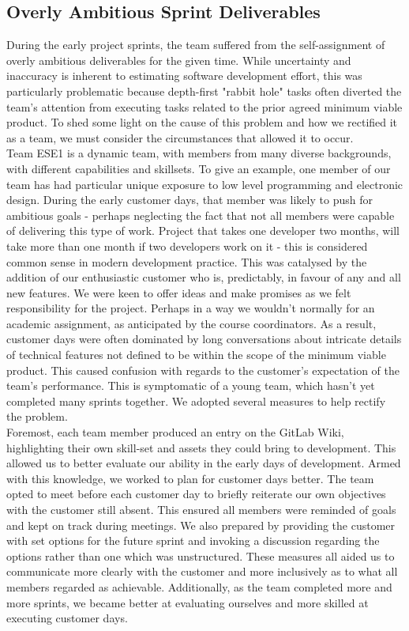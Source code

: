 \documentclass{l3proj}
\begin{document}
\subsection{Overly Ambitious Sprint Deliverables}
During the early project sprints, the team suffered from the self-assignment of overly ambitious deliverables for the given time. While uncertainty and inaccuracy is inherent to estimating software development effort\cite{ezghari}, this was particularly problematic because depth-first "rabbit hole" tasks often diverted the team's attention from executing tasks related to the prior agreed minimum viable product. To shed some light on the cause of this problem and how we rectified it as a team, we must consider the circumstances that allowed it to occur.
\\
Team ESE1 is a dynamic team, with members from many diverse backgrounds, with different capabilities and skillsets. To give an example, one member of our team has had particular unique exposure to low level programming and electronic design. During the early customer days, that member was likely to push for ambitious goals - perhaps neglecting the fact that not all members were capable of delivering this type of work. Project that takes one developer two months, will take more than one month if two developers work on it\cite{brooks} - this is considered common sense in modern development practice\cite{hanakawa}. This was catalysed by the addition of our enthusiastic customer who is, predictably, in favour of any and all new features. We were keen to offer ideas and make promises as we felt responsibility for the project. Perhaps in a way we wouldn't normally for an academic assignment, as anticipated by the course coordinators\cite{simpson}. As a result, customer days were often dominated by long conversations about intricate details of technical features not defined to be within the scope of the minimum viable product. This caused confusion with regards to the customer's expectation of the team's performance. This is symptomatic of a young team, which hasn't yet completed many sprints together. We adopted several measures to help rectify the problem. 
\\ 
Foremost, each team member produced an entry on the GitLab Wiki, highlighting their own skill-set and assets they could bring to development. This allowed us to better evaluate our ability in the early days of development. Armed with this knowledge, we worked to plan for customer days better. The team opted to meet before each customer day to briefly reiterate our own objectives with the customer still absent. This ensured all members were reminded of goals and kept on track during meetings. We also prepared by providing the customer with set options for the future sprint and invoking a discussion regarding the options rather than one which was unstructured. These measures all aided us to communicate more clearly with the customer and more inclusively as to what all members regarded as achievable. Additionally, as the team completed more and more sprints, we became better at evaluating ourselves and more skilled at executing customer days.
\end{document}

